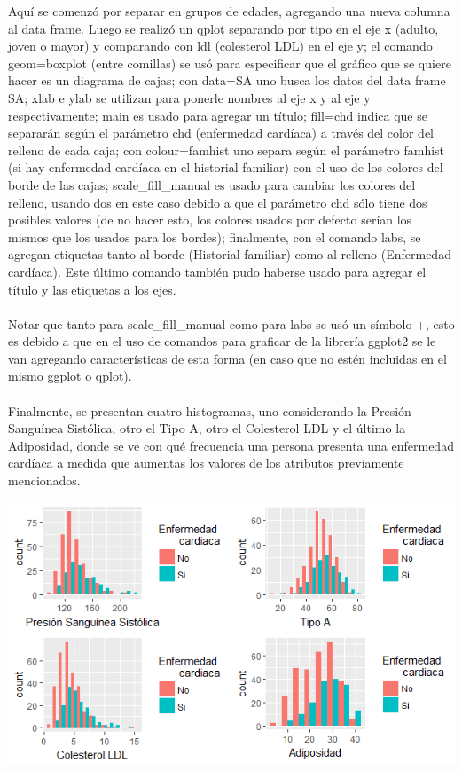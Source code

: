 \documentclass[11pt,a4paper]{article}
\begin{document}
\begin{itemize}
Aquí se comenzó por separar en grupos de edades, agregando una nueva columna al data frame. Luego se realizó un qplot separando por tipo en el eje x (adulto, joven o mayor) y comparando con ldl (colesterol LDL) en el eje y; el comando geom=boxplot (entre comillas) se usó para especificar que el gráfico que se quiere hacer es un diagrama de cajas; con data=SA uno busca los datos del data frame SA; xlab e ylab se utilizan para ponerle nombres al eje x y al eje y respectivamente; main es usado para agregar un título; fill=chd indica que se separarán según el parámetro chd (enfermedad cardíaca) a través del color del relleno de cada caja; con colour=famhist uno separa según el parámetro famhist (si hay enfermedad cardíaca en el historial familiar) con el uso de los colores del borde de las cajas; scale\_fill\_manual es usado para cambiar los colores del relleno, usando dos en este caso debido a que el parámetro chd sólo tiene dos posibles valores (de no hacer esto, los colores usados por defecto serían los mismos que los usados para los bordes); finalmente, con el comando labs, se agregan etiquetas tanto al borde (Historial familiar) como al relleno (Enfermedad cardíaca). Este último comando también pudo haberse usado para agregar el título y las etiquetas a los ejes.\\
\\
 Notar que tanto para  scale\_fill\_manual como para labs se usó un símbolo +, esto es debido a que en el uso de comandos para graficar de la librería ggplot2 se le van agregando características de esta forma (en caso que no estén incluidas en el mismo ggplot o qplot).\\
 \\
Finalmente, se presentan cuatro histogramas, uno considerando la Presión Sanguínea Sistólica, otro el Tipo A, otro el Colesterol LDL y el último la Adiposidad, donde se ve con qué frecuencia una persona presenta una enfermedad cardíaca a medida que aumentas los valores de los atributos previamente mencionados.\\


\begin{center}
\includegraphics[scale=0.9]{histograma}
\end{center}


\end{itemize}
\end{document}
